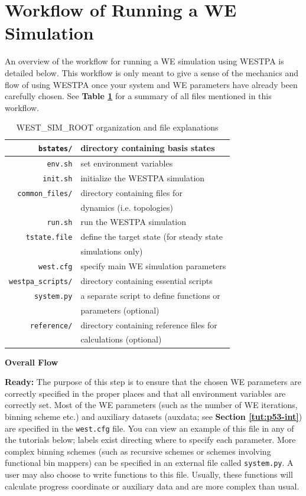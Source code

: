\section{Workflow of Running a WE Simulation}

An overview of the workflow for running a WE simulation using WESTPA is detailed below. 
This workflow is only meant to give a sense of the mechanics and flow of using WESTPA once your system and WE parameters have already been carefully chosen. See \textbf{Table \ref{intro:table2}} for a summary of all files mentioned in this workflow.

\begin{table}
\caption{WEST\_SIM\_ROOT organization and file explanations}
\label{intro:table2}
\centering
\begin{tabular}{| r | l |}
\hline
\verb|bstates/| & directory containing basis states \\
\hline
\verb|env.sh| & set environment variables \\
\hline
\verb|init.sh| & initialize the WESTPA simulation \\
\hline
\verb|common_files/| & directory containing files for \\
{} & dynamics (i.e. topologies) \\
\hline
\verb|run.sh| & run the WESTPA simulation \\
\hline
\verb|tstate.file| & define the target state (for steady state \\
{} & simulations only) \\
\hline
\verb|west.cfg| & specify main WE simulation parameters \\
\hline
\verb|westpa_scripts/| & directory containing essential scripts \\
\hline
\verb|system.py| & a separate script to define functions or \\
{} & parameters (optional) \\
\hline
\verb|reference/| & directory containing reference files for \\
{} & calculations (optional) \\
\hline
\end{tabular}
\end{table}

\noindent\textbf{Overall Flow}

\textbf{Ready:} The purpose of this step is to ensure that the chosen WE parameters are correctly specified in the proper places and that all environment variables are correctly set. 
Most of the WE parameters (such as the number of WE iterations, binning scheme etc.) and auxiliary datasets (auxdata; see \textbf{Section \ref{tut:p53-int}}) are specified in the \verb|west.cfg| file. 
You can view an example of this file in any of the tutorials below; labels exist directing where to specify each parameter. 
More complex binning schemes (such as recursive schemes or schemes involving functional bin mappers) can be specified in an external file called \verb|system.py|. 
A user may also choose to write functions to this file. 
Usually, these functions will calculate progress coordinate or auxiliary data and are more complex than usual.

